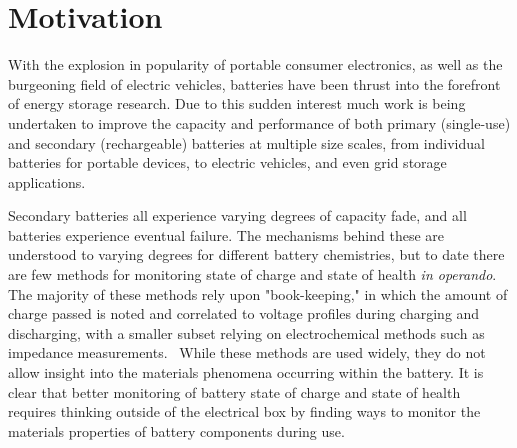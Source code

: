 \section{Motivation}
\label{sec:intro:motivation}

With the explosion in popularity of portable consumer electronics, as well as the burgeoning field of electric vehicles, batteries have been thrust into the forefront of energy storage research. Due to this sudden interest much work is being undertaken to improve the capacity and performance of both primary (single-use) and secondary (rechargeable) batteries at multiple size scales, from individual batteries for portable devices, to electric vehicles, and even grid storage applications.

Secondary batteries all experience varying degrees of capacity fade, and all batteries experience eventual failure. The mechanisms behind these are understood to varying degrees for different battery chemistries, but to date there are few methods for monitoring state of charge and state of health \textit{in operando}.~\cite{Pop2005-qv} The majority of these methods rely upon "book-keeping," in which the amount of charge passed is noted and correlated to voltage profiles during charging and discharging, with a smaller subset relying on electrochemical methods such as impedance measurements.~\cite{Huet_undated-ik} While these methods are used widely, they do not allow insight into the materials phenomena occurring within the battery. It is clear that better monitoring of battery state of charge and state of health requires thinking outside of the electrical box by finding ways to monitor the materials properties of battery components during use. 

